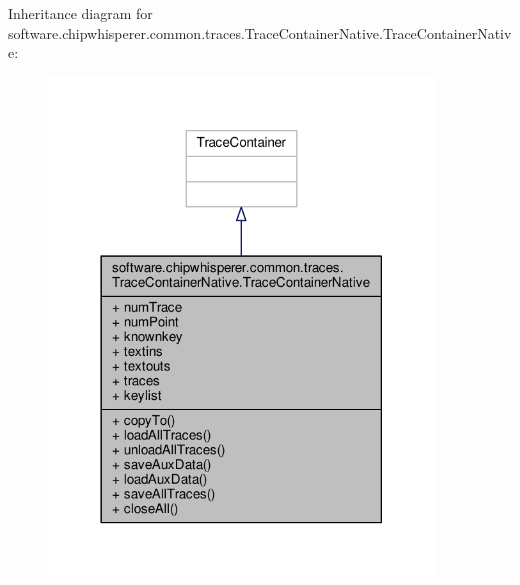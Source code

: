 Inheritance diagram for software.\+chipwhisperer.\+common.\+traces.\+Trace\+Container\+Native.\+Trace\+Container\+Native\+:\nopagebreak
\begin{figure}[H]
\begin{center}
\leavevmode
\includegraphics[width=290pt]{d3/d87/classsoftware_1_1chipwhisperer_1_1common_1_1traces_1_1TraceContainerNative_1_1TraceContainerNative__inherit__graph}
\end{center}
\end{figure}



